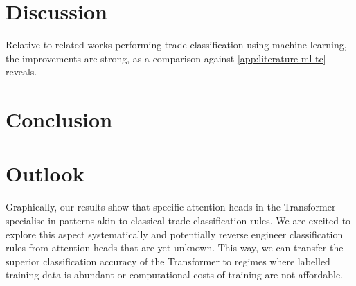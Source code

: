 \section{Discussion}\label{sec:discussion}

Relative to related works performing trade classification using machine learning, the improvements are strong, as a comparison against \cref{app:literature-ml-tc} reveals.

\newpage
\section{Conclusion}\label{sec:conclusion}

\newpage
\section{Outlook}\label{sec:outlook}

Graphically, our results show that specific attention heads in the Transformer specialise in patterns akin to classical trade classification rules. We are excited to explore this aspect systematically and potentially reverse engineer classification rules from attention heads that are yet unknown. This way, we can transfer the superior classification accuracy of the Transformer to regimes where labelled training data is abundant or computational costs of training are not affordable.